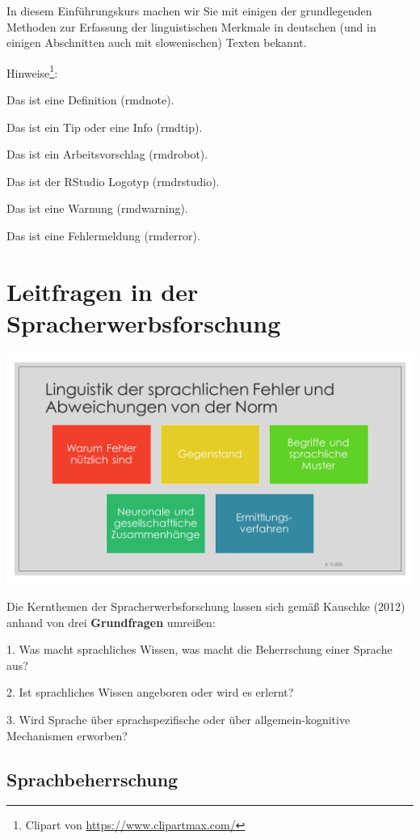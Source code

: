 \documentclass[
  letterpaper,
]{scrbook}
\begin{document}
In diesem Einführungskurs machen wir Sie mit einigen der grundlegenden
Methoden zur Erfassung der linguistischen Merkmale in deutschen (und in
einigen Abschnitten auch mit slowenischen) Texten bekannt.

Hinweise\footnote{Clipart von \url{https://www.clipartmax.com/}}:

Das ist eine Definition (rmdnote).

Das ist ein Tip oder eine Info (rmdtip).

Das ist ein Arbeitsvorschlag (rmdrobot).

Das ist der RStudio Logotyp (rmdrstudio).

Das ist eine Warnung (rmdwarning).

Das ist eine Fehlermeldung (rmderror).

\hypertarget{sec-gegenstand}{%
\chapter{Leitfragen in der
Spracherwerbsforschung}\label{sec-gegenstand}}

\includegraphics[width=1\textwidth,height=\textheight]{./pictures/Diapozitiv5.PNG}

Die Kernthemen der Spracherwerbsforschung lassen sich gemäß Kauschke
(2012) anhand von drei \textbf{Grundfragen} umreißen:

1. Was macht sprachliches Wissen, was macht die Beherrschung einer
Sprache aus?

2. Ist sprachliches Wissen angeboren oder wird es erlernt?

3. Wird Sprache über sprachspezifische oder über allgemein-kognitive
Mechanismen erworben?

\hypertarget{sprachbeherrschung}{%
\section{Sprachbeherrschung}\label{sprachbeherrschung}}
\end{document}
